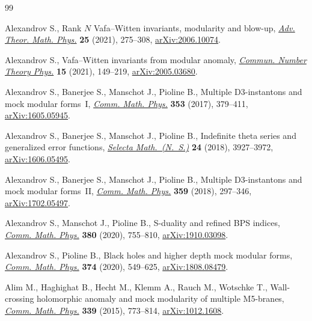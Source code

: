 \begin{thebibliography}{99}
\footnotesize\itemsep=0pt

Alexandrov S., Rank {$N$} {V}afa--{W}itten invariants, modularity and blow-up,
 \href{https://doi.org/10.4310/ATMP.2021.v25.n2.a1}{\textit{Adv. Theor. Math. Phys.}} \textbf{25} (2021), 275--308,
 \href{https://arxiv.org/abs/2006.10074}{arXiv:2006.10074}.

Alexandrov S., Vafa--{W}itten invariants from modular anomaly, \href{https://doi.org/10.4310/CNTP.2021.v15.n1.a4}{\textit{Commun.
 Number Theory Phys.}} \textbf{15} (2021), 149--219, \href{https://arxiv.org/abs/2005.03680}{arXiv:2005.03680}.

Alexandrov S., Banerjee S., Manschot J., Pioline B., Multiple {D}3-instantons
 and mock modular forms~{I}, \href{https://doi.org/10.1007/s00220-016-2799-0}{\textit{Comm. Math. Phys.}} \textbf{353} (2017),
 379--411, \href{https://arxiv.org/abs/1605.05945}{arXiv:1605.05945}.

Alexandrov S., Banerjee S., Manschot J., Pioline B., Indefinite theta series
 and generalized error functions, \href{https://doi.org/10.1007/s00029-018-0444-9}{\textit{Selecta Math.~(N.~S.)}} \textbf{24}
 (2018), 3927--3972, \href{https://arxiv.org/abs/1606.05495}{arXiv:1606.05495}.

Alexandrov S., Banerjee S., Manschot J., Pioline B., Multiple {D}3-instantons
 and mock modular forms~{II}, \href{https://doi.org/10.1007/s00220-018-3114-z}{\textit{Comm. Math. Phys.}} \textbf{359} (2018),
 297--346, \href{https://arxiv.org/abs/1702.05497}{arXiv:1702.05497}.

Alexandrov S., Manschot J., Pioline B., S-duality and refined {BPS} indices,
 \href{https://doi.org/10.1007/s00220-020-03854-6}{\textit{Comm. Math. Phys.}} \textbf{380} (2020), 755--810,
 \href{https://arxiv.org/abs/1910.03098}{arXiv:1910.03098}.

Alexandrov S., Pioline B., Black holes and higher depth mock modular forms,
 \href{https://doi.org/10.1007/s00220-019-03609-y}{\textit{Comm. Math. Phys.}} \textbf{374} (2020), 549--625,
 \href{https://arxiv.org/abs/1808.08479}{arXiv:1808.08479}.

Alim M., Haghighat B., Hecht M., Klemm A., Rauch M., Wotschke T., Wall-crossing
 holomorphic anomaly and mock modularity of multiple {M}5-branes,
 \href{https://doi.org/10.1007/s00220-015-2436-3}{\textit{Comm. Math. Phys.}} \textbf{339} (2015), 773--814, \href{https://arxiv.org/abs/1012.1608}{arXiv:1012.1608}.


\end{thebibliography}
